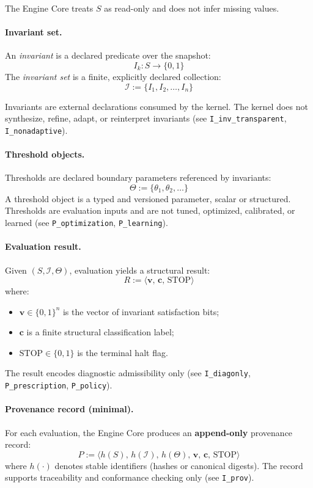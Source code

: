 The Engine Core treats $S$ as read-only and does not infer missing values.

\paragraph{Invariant set.}
An \emph{invariant} is a declared predicate over the snapshot:
\[
I_k : S \rightarrow \{0,1\}
\]
The \emph{invariant set} is a finite, explicitly declared collection:
\[
\mathcal{I} := \{ I_1, I_2, \dots, I_n \}
\]

Invariants are external declarations consumed by the kernel.
The kernel does not synthesize, refine, adapt, or reinterpret invariants
(see \texttt{I\_inv\_transparent}, \texttt{I\_nonadaptive}).

\paragraph{Threshold objects.}
Thresholds are declared boundary parameters referenced by invariants:
\[
\Theta := \{\theta_1, \theta_2, \dots\}
\]
A threshold object is a typed and versioned parameter, scalar or structured.
Thresholds are evaluation inputs and are not tuned, optimized, calibrated, or learned
(see \texttt{P\_optimization}, \texttt{P\_learning}).

\paragraph{Evaluation result.}
Given $(S, \mathcal{I}, \Theta)$, evaluation yields a structural result:
\[
R := \langle \mathbf{v},\, \mathbf{c},\, \mathrm{STOP} \rangle
\]
where:
\begin{itemize}
  \item $\mathbf{v} \in \{0,1\}^n$ is the vector of invariant satisfaction bits;
  \item $\mathbf{c}$ is a finite structural classification label;
  \item $\mathrm{STOP} \in \{0,1\}$ is the terminal halt flag.
\end{itemize}

The result encodes diagnostic admissibility only (see \texttt{I\_diagonly},
\texttt{P\_prescription}, \texttt{P\_policy}).

\paragraph{Provenance record (minimal).}
For each evaluation, the Engine Core produces an \textbf{append-only} provenance
record:
\[
P := \langle h(S),\, h(\mathcal{I}),\, h(\Theta),\, \mathbf{v},\, \mathbf{c},\, \mathrm{STOP} \rangle
\]
where $h(\cdot)$ denotes stable identifiers (hashes or canonical digests).
The record supports traceability and conformance checking only
(see \texttt{I\_prov}).

